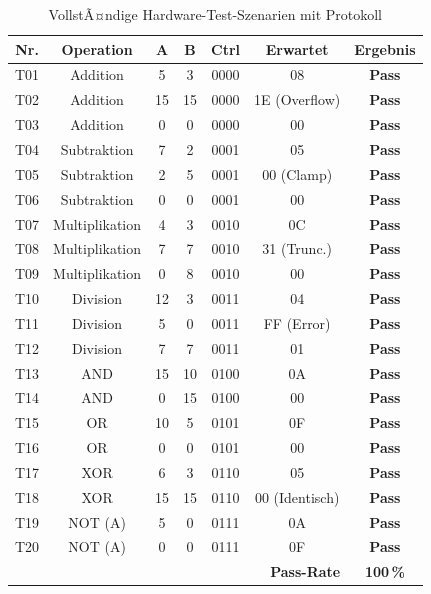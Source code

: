 ﻿\documentclass[12pt,a4paper]{report}
\begin{document}
\begin{table}[H]
\centering
\begin{tabular}{|c|c|c|c|c|c|c|}
\hline
\textbf{Nr.} & \textbf{Operation} & \textbf{A} & \textbf{B} & \textbf{Ctrl} & \textbf{Erwartet} & \textbf{Ergebnis} \\
\hline
T01 & Addition      &  5 &  3 & 0000 & 08            & \textbf{Pass} \\
T02 & Addition      & 15 & 15 & 0000 & 1E (Overflow) & \textbf{Pass} \\
T03 & Addition      &  0 &  0 & 0000 & 00            & \textbf{Pass} \\
T04 & Subtraktion   &  7 &  2 & 0001 & 05            & \textbf{Pass} \\
T05 & Subtraktion   &  2 &  5 & 0001 & 00 (Clamp)    & \textbf{Pass} \\
T06 & Subtraktion   &  0 &  0 & 0001 & 00            & \textbf{Pass} \\
T07 & Multiplikation&  4 &  3 & 0010 & 0C            & \textbf{Pass} \\
T08 & Multiplikation&  7 &  7 & 0010 & 31 (Trunc.)   & \textbf{Pass} \\
T09 & Multiplikation&  0 &  8 & 0010 & 00            & \textbf{Pass} \\
T10 & Division      & 12 &  3 & 0011 & 04            & \textbf{Pass} \\
T11 & Division      &  5 &  0 & 0011 & FF (Error)    & \textbf{Pass} \\
T12 & Division      &  7 &  7 & 0011 & 01            & \textbf{Pass} \\
T13 & AND           & 15 & 10 & 0100 & 0A            & \textbf{Pass} \\
T14 & AND           &  0 & 15 & 0100 & 00            & \textbf{Pass} \\
T15 & OR            & 10 &  5 & 0101 & 0F            & \textbf{Pass} \\
T16 & OR            &  0 &  0 & 0101 & 00            & \textbf{Pass} \\
T17 & XOR           &  6 &  3 & 0110 & 05            & \textbf{Pass} \\
T18 & XOR           & 15 & 15 & 0110 & 00 (Identisch)& \textbf{Pass} \\
T19 & NOT (A)       &  5 &  0 & 0111 & 0A            & \textbf{Pass} \\
T20 & NOT (A)       &  0 &  0 & 0111 & 0F            & \textbf{Pass} \\
\hline
\multicolumn{6}{|r|}{\textbf{Pass-Rate}} & \textbf{100\,\%} \\
\hline
\end{tabular}
\caption{VollstÃ¤ndige Hardware-Test-Szenarien mit Protokoll}
\label{tab:hardware_tests}
\end{table}
\end{document}
